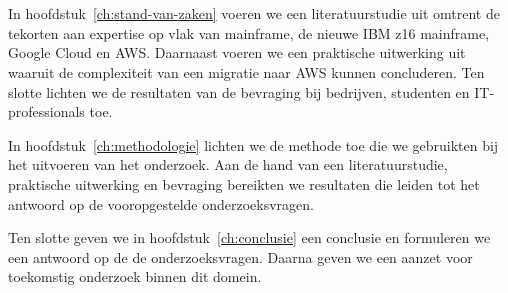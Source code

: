 \newpage

\section{}
\label{sec:opzet-bachelorproef}


In hoofdstuk~\ref{ch:stand-van-zaken} voeren we een literatuurstudie uit omtrent de tekorten aan expertise op vlak van mainframe, de nieuwe IBM z16 mainframe, Google Cloud en AWS. Daarnaast voeren we een praktische uitwerking uit waaruit de complexiteit van een migratie naar AWS kunnen concluderen. Ten slotte lichten we de resultaten van de bevraging bij bedrijven, studenten en IT-professionals toe. 

In hoofdstuk~\ref{ch:methodologie}  lichten we de methode toe die we gebruikten bij het uitvoeren van het onderzoek. Aan de hand van een literatuurstudie, praktische uitwerking en bevraging bereikten we resultaten die leiden tot het antwoord op de vooropgestelde onderzoeksvragen. 


Ten slotte geven we in hoofdstuk~\ref{ch:conclusie} een conclusie en formuleren we een antwoord op de de onderzoeksvragen. Daarna geven we een aanzet voor toekomstig onderzoek binnen dit domein. 
